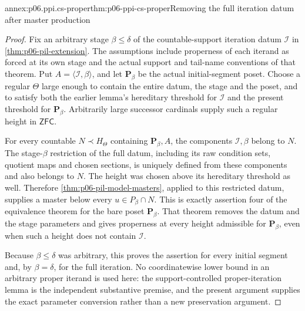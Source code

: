 \begin{annexitem}{annex:p06.ppi.cs-proper}{thm:p06-ppi-cs-proper}{Removing the full iteration datum after master production}
\begin{proof}
Fix an arbitrary stage \(\beta\leq\delta\) of the countable-support
iteration datum \(\mathcal I\) in
\cref{thm:p06-pil-extension}. The assumptions include properness of
each iterand as forced at its own stage and the actual support and
tail-name conventions of that theorem. Put
\(A=\langle\mathcal I,\beta\rangle\), and let
\(\mathbf P_\beta\) be the actual initial-segment poset.
Choose a regular \(\Theta\) large enough to contain the entire datum,
the stage and the poset, and to satisfy both the earlier lemma's
hereditary threshold for \(\mathcal I\) and the present threshold
for \(\mathbf P_\beta\). Arbitrarily large successor cardinals supply
such a regular height in \(\mathsf{ZFC}\).

For every countable \(N\prec H_\Theta\) containing
\(\mathbf P_\beta,A\), the components \(\mathcal I,\beta\) belong
to \(N\). The stage-\(\beta\) restriction of the full datum, including
its raw condition sets, quotient maps and chosen sections, is uniquely
defined from these components and also belongs to \(N\). The height
was chosen above its hereditary threshold as well. Therefore
\cref{thm:p06-pil-model-masters}, applied to this restricted datum,
supplies a master below every \(u\in P_\beta\cap N\).
This is exactly assertion four of the equivalence theorem for the
bare poset \(\mathbf P_\beta\). That theorem removes the datum and
the stage parameters and gives properness at every height admissible
for \(\mathbf P_\beta\), even when such a height does not contain
\(\mathcal I\).

Because \(\beta\leq\delta\) was arbitrary, this proves the assertion
for every initial segment and, by \(\beta=\delta\), for the full
iteration. No coordinatewise lower bound in an arbitrary proper
iterand is used here: the support-controlled proper-iteration lemma
is the independent substantive premise, and the present argument
supplies the exact parameter conversion rather than a new preservation
argument.
\end{proof}
\end{annexitem}

